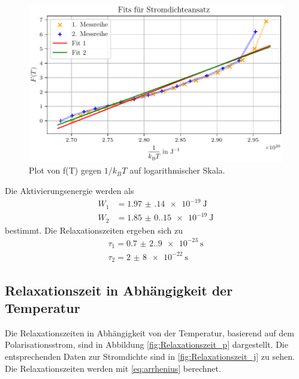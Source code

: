 \begin{figure}[H]
    \centering
    \includegraphics[width=\textwidth]{plots/H_stromdichte.pdf}
    \caption{Plot von f(T) gegen $1/k_BT$ auf logarithmischer Skala.}
    \label{fig:Stromdichteansatz}
\end{figure}

Die Aktivierungsenergie werden als 
\begin{align*}
W_1   &= \qty{1.97(14)e-19}{\joule}\\
W_2  &= \qty{1.85(0.15)e-19}{\joule}
\end{align*} 
bestimmt.
Die Relaxationszeiten ergeben sich zu
\begin{align*}
\tau_1 = \qty{0.7(2.9)e-23}{\second}\\
\tau_2 = \qty{2(8)e-22}{\second}
\end{align*} 

\subsection{Relaxationszeit in Abhängigkeit der Temperatur}
Die Relaxationszeiten in Abhängigkeit von der Temperatur, basierend auf dem Polarisationsstrom,
sind in Abbildung \autoref{fig:Relaxationszeit_p} dargestellt. Die entsprechenden Daten zur Stromdichte sind in \autoref{fig:Relaxationszeit_j} zu sehen.
Die Relaxationszeiten werden mit \autoref{eq:arrhenius} berechnet.

